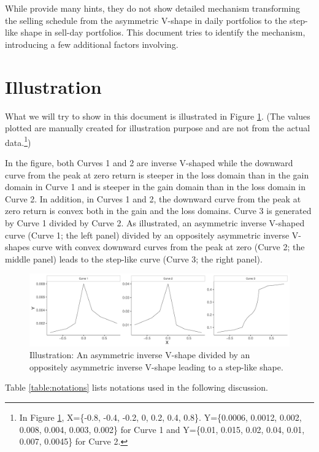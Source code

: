 \documentclass[11pt, a4paper]{article}
\begin{document}
While \citet{BenDavidHirshleifer12} provide many hints, they do not show detailed mechanism transforming the selling schedule from the asymmetric V-shape in daily portfolios to the step-like shape in sell-day portfolios. This document tries to identify the mechanism, introducing a few additional factors involving.      

\section{Illustration}
What we will try to show in this document is illustrated in Figure \ref{figure:illustration}. (The values plotted are manually created for illustration purpose and are not from the actual data.\footnote{In Figure \ref{figure:illustration}, X=\{-0.8, -0.4, -0.2, 0, 0.2, 0.4, 0.8\}. Y=\{0.0006, 0.0012, 0.002, 0.008, 0.004, 0.003, 0.002\} for Curve 1 and Y=\{0.01, 0.015, 0.02, 0.04, 0.01, 0.007, 0.0045\} for Curve 2.}) 

In the figure, both Curves 1 and 2 are inverse V-shaped while the downward curve from the peak at zero return is steeper in the loss domain than in the gain domain in Curve 1 and is steeper in the gain domain than in the loss domain in Curve 2. In addition, in Curves 1 and 2, the downward curve from the peak at zero return is convex both in the gain and the loss domains. Curve 3 is generated by Curve 1 divided by Curve 2. As illustrated, an asymmetric inverse V-shaped curve (Curve 1; the left panel) divided by an oppositely asymmetric inverse V-shapes curve with convex downward curves from the peak at zero (Curve 2; the middle panel) leads to the step-like curve (Curve 3; the right panel).


\begin{figure}[H]
	\centering
	\includegraphics[width=1.1\columnwidth]{illustration.pdf}
	\caption{\small Illustration: An asymmetric inverse  V-shape divided by an oppositely asymmetric inverse V-shape leading to a step-like shape.}
	\label{figure:illustration}
\end{figure}

Table \ref{table:notations} lists notations used in the following discussion.
\end{document}
